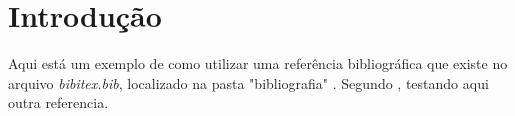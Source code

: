 \chapter{Introdução}

Aqui está um exemplo de como utilizar uma referência  bibliográfica que existe no arquivo \textit{bibitex.bib}, localizado na pasta "bibliografia" \cite{atlas:2006}. Segundo , testando aqui outra referencia.

\lipsum[4-5]

